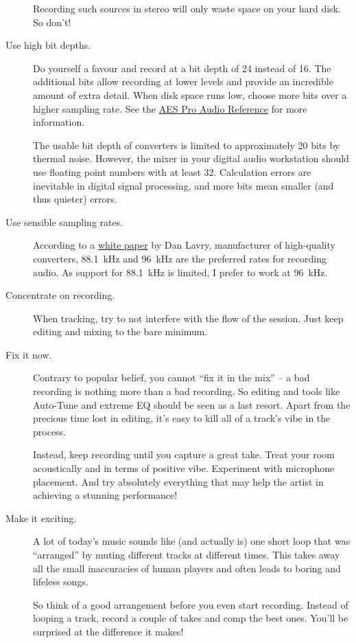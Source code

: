 \begin{description}
  Recording such sources in stereo will only waste space on your hard
  disk.  So don't!

\item[Use high bit depths.]  Do yourself a favour and record at a bit
  depth of \SI{24}{\bits} instead of \SI{16}{\bits}.  The additional
  bits allow recording at lower levels and provide an incredible
  amount of extra detail.  When disk space runs low, choose more bits
  over a higher sampling rate.  See the
  \href{http://www.aes.org/par/d/\#data_converter_bits}{AES Pro Audio
    Reference} for more information.

  The usable bit depth of converters is limited to approximately 20
  bits by thermal noise.  However, the mixer in your digital audio
  workstation should use floating point numbers with at least
  \SI{32}{\bits}.  Calculation errors are inevitable in digital signal
  processing, and more bits mean smaller (and thus quieter) errors.

\item[Use sensible sampling rates.]  According to a
  \href{http://www.lavryengineering.com/pdfs/lavry-white-paper-the_optimal_sample_rate_for_quality_audio.pdf}{white
    paper} by Dan Lavry, manufacturer of high-quality converters,
  \SI{88.1}{\kilo\hertz} and \SI{96}{\kilo\hertz} are the preferred
  rates for recording audio.  As support for \SI{88.1}{\kilo\hertz} is
  limited, I prefer to work at \SI{96}{\kilo\hertz}.

\item[Concentrate on recording.]  When tracking, try to not interfere
  with the flow of the session.  Just keep editing and mixing to the
  bare minimum.

\item[Fix it now.]  Contrary to popular belief, you cannot ``fix it in
  the mix'' -- a bad recording is nothing more than a bad recording.
  So editing and tools like Auto-Tune and extreme EQ should be seen as
  a last resort.  Apart from the precious time lost in editing, it's
  easy to kill all of a track's vibe in the process.

  Instead, keep recording until you capture a great take.  Treat your
  room acoustically and in terms of positive vibe.  Experiment with
  microphone placement.  And try absolutely everything that may help
  the artist in achieving a stunning performance!

\item[Make it exciting.]  A lot of today's music sounds like (and
  actually is) one short loop that was ``arranged'' by muting
  different tracks at different times.  This takes away all the small
  inaccuracies of human players and often leads to boring and lifeless
  songs.

  So think of a good arrangement before you even start recording.
  Instead of looping a track, record a couple of takes and comp the
  best ones.  You'll be surprised at the difference it makes!

\end{description}

